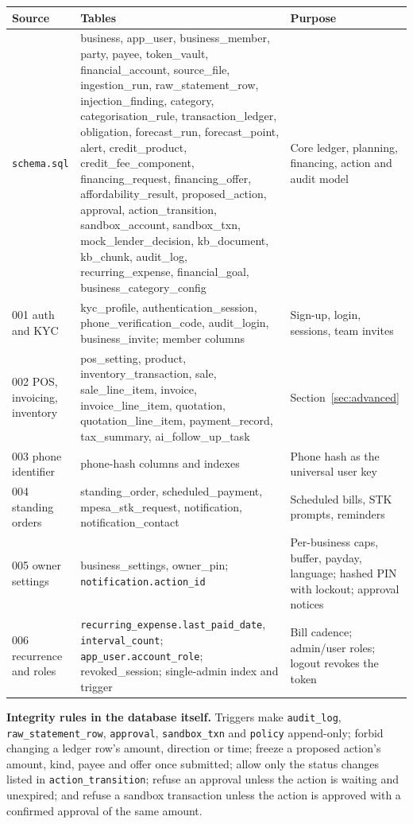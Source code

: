 \documentclass[10pt,a4paper]{article}
\newcommand{\code}[1]{\texttt{\small #1}}
\begin{document}
\begingroup\footnotesize
\begin{longtable}{@{}p{3.4cm}p{6.0cm}p{5.6cm}@{}}
\toprule
\textbf{Source} & \textbf{Tables} & \textbf{Purpose}\\
\midrule\endhead
\code{schema.sql} & business, app\_user, business\_member, party, payee, token\_vault, financial\_account, source\_file, ingestion\_run, raw\_statement\_row, injection\_finding, category, categorisation\_rule, transaction\_ledger, obligation, forecast\_run, forecast\_point, alert, credit\_product, credit\_fee\_component, financing\_request, financing\_offer, affordability\_result, proposed\_action, approval, action\_transition, sandbox\_account, sandbox\_txn, mock\_lender\_decision, kb\_document, kb\_chunk, audit\_log, recurring\_expense, financial\_goal, business\_category\_config & Core ledger, planning, financing, action and audit model\\
001 auth and KYC & kyc\_profile, authentication\_session, phone\_verification\_code, audit\_login, business\_invite; member columns & Sign-up, login, sessions, team invites\\
002 POS, invoicing, inventory & pos\_setting, product, inventory\_transaction, sale, sale\_line\_item, invoice, invoice\_line\_item, quotation, quotation\_line\_item, payment\_record, tax\_summary, ai\_follow\_up\_task & Section~\ref{sec:advanced}\\
003 phone identifier & phone-hash columns and indexes & Phone hash as the universal user key\\
004 standing orders & standing\_order, scheduled\_payment, mpesa\_stk\_request, notification, notification\_contact & Scheduled bills, STK prompts, reminders\\
005 owner settings & business\_settings, owner\_pin; \code{notification.action\_id} & Per-business caps, buffer, payday, language; hashed PIN with lockout; approval notices\\
006 recurrence and roles & \code{recurring\_expense.last\_paid\_date}, \code{interval\_count}; \code{app\_user.account\_role}; revoked\_session; single-admin index and trigger & Bill cadence; admin/user roles; logout revokes the token\\
\bottomrule
\end{longtable}
\endgroup

\textbf{Integrity rules in the database itself.} Triggers make \code{audit\_log}, \code{raw\_statement\_row}, \code{approval}, \code{sandbox\_txn} and \code{policy} append-only; forbid changing a ledger row's amount, direction or time; freeze a proposed action's amount, kind, payee and offer once submitted; allow only the status changes listed in \code{action\_transition}; refuse an approval unless the action is waiting and unexpired; and refuse a sandbox transaction unless the action is approved with a confirmed approval of the same amount.
\end{document}
